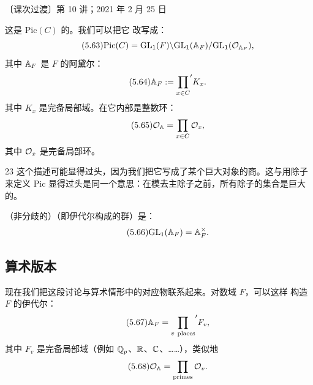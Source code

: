 \begin{flushright}\small 〔课次过渡〕第 10 讲；2021 年 2 月 25 日\end{flushright}

这是 $\mathrm{Pic}(C)$ 的。我们可以把它
改写成：
\begin{equation}\tag{5.63}
\mathrm{Pic}(C)=\mathrm{GL}_{1}(F)\backslash\mathrm{GL}_{1}(\mathbb{A}_{F})/\mathrm{GL}_{1}(\mathcal{O}_{\mathbb{A}_{F}}),
\end{equation}
其中 $\mathbb{A}_{F}$ 是 $F$ 的阿黛尔：
\begin{equation}\tag{5.64}
\mathbb{A}_{F}:={\prod_{x\in C}}'K_{x}.
\end{equation}
其中 $K_{x}$ 是完备局部域。在它内部是整数环：
\begin{equation}\tag{5.65}
\mathcal{O}_{\mathbb{A}}=\prod_{x\in C}\mathcal{O}_{x},
\end{equation}
其中 $\mathcal{O}_{x}$ 是完备局部环。

\begin{srcrem}{23}
这个描述可能显得过头，因为我们把它写成了某个巨大对象的商。这与用除子来定义
$\mathrm{Pic}$ 显得过头是同一个意思：在模去主除子之前，所有除子的集合是巨大的。
\end{srcrem}

（非分歧的）（即伊代尔构成的群）是：
\begin{equation}\tag{5.66}
\mathrm{GL}_{1}(\mathbb{A}_{F})=\mathbb{A}_{F}^{\times}.
\end{equation}

\subsection*{算术版本}

现在我们把这段讨论与算术情形中的对应物联系起来。对数域 $F$，可以这样
构造 $F$ 的伊代尔：
\begin{equation}\tag{5.67}
\mathbb{A}_{F}={\prod_{v\ \text{places}}}'F_{v},
\end{equation}
其中 $F_{v}$ 是完备局部域（例如 $\mathbb{Q}_{p}$、$\mathbb{R}$、$\mathbb{C}$、……），类似地
\begin{equation}\tag{5.68}
\mathcal{O}_{\mathbb{A}}=\prod_{\text{primes}}\mathcal{O}_{v}.
\end{equation}

